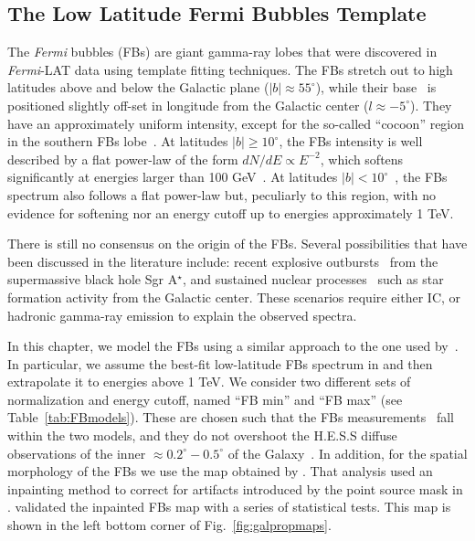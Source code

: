 \documentclass[doublespace,nopageskip]{VTthesis} %
\begin{document}
\subsection{The Low Latitude Fermi Bubbles Template}
\label{subsec:FBs}

The \textit{Fermi} bubbles (FBs) are giant gamma-ray lobes that were discovered in \textit{Fermi}-LAT data \citep{2010ApJ...724.1044S} using template fitting techniques. The FBs stretch out to high latitudes above and below the Galactic plane ($\lvert b \rvert \approx 55^\circ$), while their base~\citep{2019A&A...625A.110H} is positioned slightly off-set in longitude from the Galactic center ($l\approx-5^\circ$). 
They have an approximately uniform intensity, except for the so-called ``cocoon'' region in the southern FBs lobe~\citep{2012ApJ...753...61S, 2014ApJ...793...64A}. At latitudes $\lvert b
\rvert \geq 10^\circ$, the FBs intensity is well described by a flat power-law of the form $dN/dE\propto E^{-2}$, which  softens significantly at energies larger than 100 GeV~\citep{2014ApJ...793...64A}. At latitudes $\lvert b \rvert < 10^\circ$~\citep{2016ApJS..223...26A,2017ApJ...840...43A,2017JCAP...08..022S,2019A&A...625A.110H}, the FBs spectrum also follows a flat power-law but, peculiarly to this region, with no evidence for softening nor an energy cutoff up to energies approximately 1 TeV. 

There is still no consensus on the origin of the FBs. Several possibilities that have been discussed in the literature include: recent explosive outbursts~\citep{2010ApJ...724.1044S} from the supermassive black hole Sgr A$^\star$, and sustained nuclear processes~\citep{2015ApJ...808..107C} such as star formation activity from the Galactic center. These scenarios require either IC, or hadronic gamma-ray emission to explain the observed spectra.

In this chapter, we model the FBs using a similar approach to the one used by~\cite{2021PhRvD.103b3011R}. In particular, we assume the best-fit low-latitude FBs spectrum in \cite{2017ApJ...840...43A} and then extrapolate it to energies above 1 TeV. We consider two different sets of normalization and energy cutoff, named ``FB min'' and ``FB max'' (see Table~\ref{tab:FBmodels}). These are chosen such that the FBs measurements~\citep{2017ApJ...840...43A} fall within the two models, and they do not overshoot the H.E.S.S diffuse observations of the inner $\approx 0.2^\circ - 0.5^\circ$ of the Galaxy~\citep{2016Natur.531..476H}. In addition, for the spatial morphology of the FBs we use the map obtained by \citet{2019JCAP...09..042M}. That analysis used an inpainting method to correct for artifacts introduced by the point source mask in \cite{2017ApJ...840...43A}. \cite{2019JCAP...09..042M} validated the inpainted FBs map with a series of statistical tests. This map is shown in the left bottom corner of Fig.~\ref{fig:galpropmaps}.
\end{document}

